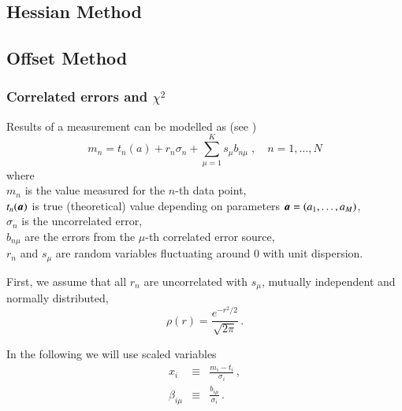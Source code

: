 \subsection{Hessian Method}

\subsection{Offset Method}

\newcommand{\rs}{s}
\newcommand{\ce}{b}
\DeclareRobustCommand\Vstat{\ensuremath{V^{\mathrm{(unc)}}}\ssp}
\DeclareRobustCommand\Vsys{\ensuremath{V^{\mathrm{(cor)}}}\ssp}
\DeclareRobustCommand\mb[1]{\ensuremath{\mbox{\mathversion{bold}{$#1$}}}\ssp}
\DeclareRobustCommand\mbs[1]{\ensuremath{\mbox{\mathversion{bold}{\scriptsize $#1$}}}\ssp}

\subsubsection {Correlated errors and \texorpdfstring{$\chi^2$}{chi2}}
\label{sec:cor-chi2}

Results of a measurement can be modelled as
(see \eg \cite{Stump:2001gu,Botje:2001fx})
\begin{equation}
m_n = t_n(a) + r_n \sigma_n + \sum_{\mu=1}^K \rs_\mu \ce_{n\mu}
\;,\quad n=1,\dots,N
\end{equation}
where\\
$m_n$ is the value measured for the $n$-th data point,\\
$t_n(\mb a)$ is true (theoretical) value depending on parameters $\mb a = (a_1,\dots, a_M)$,\\
$\sigma_n$ is the uncorrelated error,\\
$\ce_{n\mu}$ are the errors from the $\mu$-th correlated error source,\\
$r_n$ and $\rs_\mu$ are random variables fluctuating around 0 with unit dispersion.

First, we assume that all $r_n$ are uncorrelated with $\rs_\mu$,
mutually independent and normally distributed,
\begin{equation}
\rho(r) = \frac{e^{-r^2/2}}{\sqrt{2\pi}}
\,.
\end{equation}

In the following we will use scaled variables
\begin{subequations}
\begin{eqnarray}
x_i &\equiv& \frac{m_i-t_i}{\sigma_i}
\,,
\\
\beta_{i\mu} &\equiv& \frac{\ce_{i\mu}}{\sigma_i}
\,.
\end{eqnarray}
\end{subequations}

